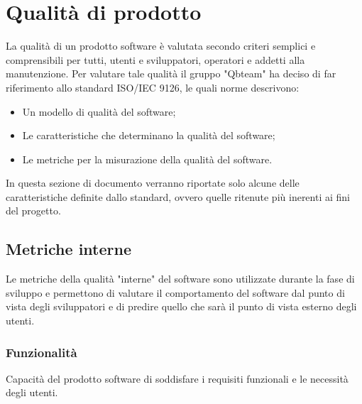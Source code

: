 \section{Qualità di prodotto}
La qualità di un prodotto software è valutata secondo criteri semplici e comprensibili per tutti, utenti e sviluppatori, operatori e addetti alla manutenzione.
Per valutare tale qualità il gruppo "Qbteam" ha deciso di far riferimento allo standard ISO/IEC 9126, le quali norme descrivono:

\begin{itemize}
\item Un modello di qualità del software;
\item Le caratteristiche che determinano la qualità del software;
\item Le metriche per la misurazione della qualità del software.
\end{itemize}
In questa sezione di documento verranno riportate solo alcune delle caratteristiche definite dallo standard, ovvero quelle ritenute più inerenti ai fini del progetto.

\subsection{Metriche interne}
 Le metriche della qualità "interne" del software sono utilizzate durante la fase di sviluppo e permettono di valutare il comportamento del software dal punto di vista degli sviluppatori e di predire quello che sarà il punto di vista esterno degli utenti.
  \subsubsection{Funzionalità}
      Capacità del prodotto software di soddisfare i requisiti funzionali e le necessità degli utenti.

